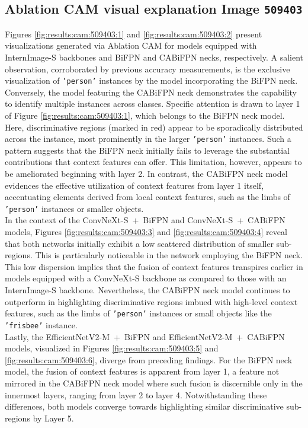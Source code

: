 \subsection{Ablation CAM visual explanation Image \texttt{509403}} \label{subsec:40:cam:509403}
Figures \ref{fig:results:cam:509403:1} and \ref{fig:results:cam:509403:2} present visualizations generated via Ablation CAM for models equipped with InternImage-S backbones and BiFPN and CABiFPN necks, respectively. A salient observation, corroborated by previous accuracy measurements, is the exclusive visualization of \texttt{'person'} instances by the model incorporating the BiFPN neck. Conversely, the model featuring the CABiFPN neck demonstrates the capability to identify multiple instances across classes.
Specific attention is drawn to layer 1 of Figure \ref{fig:results:cam:509403:1}, which belongs to the BiFPN neck model. Here, discriminative regions (marked in red) appear to be sporadically distributed across the instance, most prominently in the larger \texttt{'person'} instances. Such a pattern suggests that the BiFPN neck initially fails to leverage the substantial contributions that context features can offer. This limitation, however, appears to be ameliorated beginning with layer 2. In contrast, the CABiFPN neck model evidences the effective utilization of context features from layer 1 itself, accentuating elements derived from local context features, such as the limbs of \texttt{'person'} instances or smaller objects.\\

In the context of the ConvNeXt-S~+~BiFPN and ConvNeXt-S~+~CABiFPN models, Figures \ref{fig:results:cam:509403:3} and \ref{fig:results:cam:509403:4} reveal that both networks initially exhibit a low scattered distribution of smaller sub-regions. This is particularly noticeable in the network employing the BiFPN neck. This low dispersion implies that the fusion of context features transpires earlier in models equipped with a ConvNeXt-S backbone as compared to those with an InternImage-S backbone. Nevertheless, the CABiFPN neck model continues to outperform in highlighting discriminative regions imbued with high-level context features, such as the limbs of \texttt{'person'} instances or small objects like the \texttt{'frisbee'} instance.\\

Lastly, the EfficientNetV2-M~+~BiFPN and EfficientNetV2-M~+~CABiFPN models, visualized in Figures \ref{fig:results:cam:509403:5} and \ref{fig:results:cam:509403:6}, diverge from preceding findings. For the BiFPN neck model, the fusion of context features is apparent from layer 1, a feature not mirrored in the CABiFPN neck model where such fusion is discernible only in the innermost layers, ranging from layer 2 to layer 4. Notwithstanding these differences, both models converge towards highlighting similar discriminative sub-regions by Layer 5.

